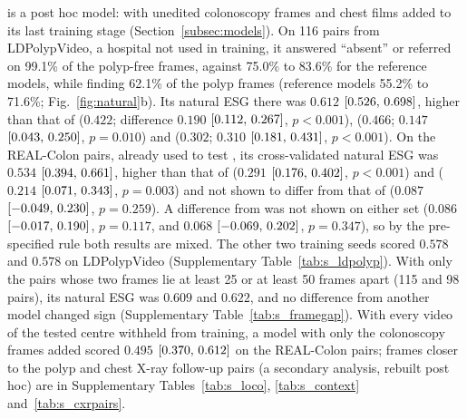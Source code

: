 \msn{} is a post hoc model: \msp{} with unedited colonoscopy frames and chest films added to its last training stage (Section~\ref{subsec:models}). On 116 pairs from LDPolypVideo, a hospital not used in training, it answered ``absent'' or referred on 99.1\% of the polyp-free frames, against 75.0\% to 83.6\% for the reference models, while finding 62.1\% of the polyp frames (reference models 55.2\% to 71.6\%; Fig.~\ref{fig:natural}b). Its natural ESG there was $0.612$ $[0.526,\,0.698]$, higher than that of \ms{} ($0.422$; difference $0.190$ $[0.112,\,0.267]$, $p < 0.001$), \opus{} ($0.466$; $0.147$ $[0.043,\,0.250]$, $p = 0.010$) and \gpt{} ($0.302$; $0.310$ $[0.181,\,0.431]$, $p < 0.001$). On the REAL-Colon pairs, already used to test \ms{}, its cross-validated natural ESG was $0.534$ $[0.394,\,0.661]$, higher than that of \ms{} ($0.291$ $[0.176,\,0.402]$, $p < 0.001$) and \gpt{} ($0.214$ $[0.071,\,0.343]$, $p = 0.003$) and not shown to differ from that of \opus{} ($0.087$ $[-0.049,\,0.230]$, $p = 0.259$). A difference from \gem{} was not shown on either set ($0.086$ $[-0.017,\,0.190]$, $p = 0.117$, and $0.068$ $[-0.069,\,0.202]$, $p = 0.347$), so by the pre-specified rule both results are mixed. The other two training seeds scored $0.578$ and $0.578$ on LDPolypVideo (Supplementary Table~\ref{tab:s_ldpolyp}). With only the pairs whose two frames lie at least 25 or at least 50 frames apart (115 and 98 pairs), its natural ESG was $0.609$ and $0.622$, and no difference from another model changed sign (Supplementary Table~\ref{tab:s_framegap}). With every video of the tested centre withheld from training, a model with only the colonoscopy frames added scored $0.495$ $[0.370,\,0.612]$ on the REAL-Colon pairs; frames closer to the polyp and chest X-ray follow-up pairs (a secondary analysis, rebuilt post hoc) are in Supplementary Tables~\ref{tab:s_loco}, \ref{tab:s_context} and~\ref{tab:s_cxrpairs}.

